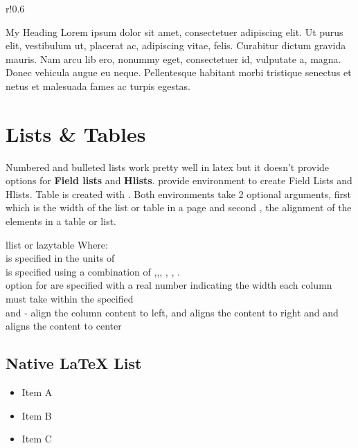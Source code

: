 \documentclass[12pt,a4paper]{report}
\begin{document}
\lipsum[1]
\begin{wrapfigure}{r!}{0.6\textwidth}
	\begin{sidebar}{My Heading}
		Lorem ipsum dolor sit amet, consectetuer adipiscing elit. Ut purus elit, vestibulum ut, placerat ac, adipiscing vitae, felis. Curabitur dictum gravida mauris. Nam arcu lib ero, nonummy eget, consectetuer id, vulputate a, magna. Donec vehicula augue eu neque. Pellentesque habitant morbi tristique senectus et netus et malesuada fames ac turpis egestas.
	\end{sidebar}
\end{wrapfigure}
\lipsum[2]

\section{Lists \& Tables}
\label{listntables}
Numbered and bulleted lists work pretty well in latex but it doesn't provide options for \textbf{Field lists} and \textbf{Hlists}.  provide  environment to create Field Lists and Hlists. Table is created with . Both environments take 2 optional arguments, first  which is the width of the list or table in a page and second , the alignment of the elements in a table or list.\\
\begin{tip}[Command]
\begin{docEnvironment}%
	[doclang/environment content=content]%
	{llist or lazytable}{}
	Where:\\
	 is specified in the units of \\
	\noindent	
 	 is specified using a combination of ,,, , , .\\
 	\noindent
	 option for  are specified with a real number indicating the width each column must take within the specified \\
	\noindent
	 and  - align the column content to left,  and  aligns the content to right and  and  aligns the content to center
\end{docEnvironment}
\end{tip}
	
\subsection{Native {\LaTeX} List}
\begin{itemize}
	\item Item A
	\item Item B
	\item Item C	
\end{itemize}
\end{document}
